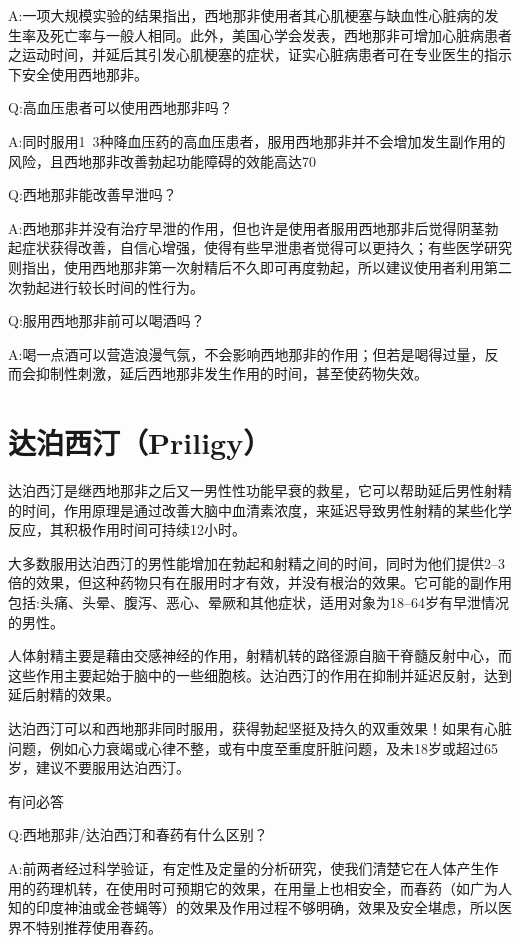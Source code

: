 \documentclass[12pt,UTF8]{ctexbook}
\begin{document}
A:一项大规模实验的结果指出，西地那非使用者其心肌梗塞与缺血性心脏病的发生率及死亡率与一般人相同。此外，美国心学会发表，西地那非可增加心脏病患者之运动时间，并延后其引发心肌梗塞的症状，证实心脏病患者可在专业医生的指示下安全使用西地那非。

Q:高血压患者可以使用西地那非吗？

A:同时服用1~3种降血压药的高血压患者，服用西地那非并不会增加发生副作用的风险，且西地那非改善勃起功能障碍的效能高达70%

Q:西地那非能改善早泄吗？

A:西地那非并没有治疗早泄的作用，但也许是使用者服用西地那非后觉得阴茎勃起症状获得改善，自信心增强，使得有些早泄患者觉得可以更持久；有些医学研究则指出，使用西地那非第一次射精后不久即可再度勃起，所以建议使用者利用第二次勃起进行较长时间的性行为。

Q:服用西地那非前可以喝酒吗？

A:喝一点酒可以营造浪漫气氛，不会影响西地那非的作用；但若是喝得过量，反而会抑制性刺激，延后西地那非发生作用的时间，甚至使药物失效。

\section{达泊西汀（Priligy）}

达泊西汀是继西地那非之后又一男性性功能早衰的救星，它可以帮助延后男性射精的时间，作用原理是通过改善大脑中血清素浓度，来延迟导致男性射精的某些化学反应，其积极作用时间可持续12小时。

大多数服用达泊西汀的男性能增加在勃起和射精之间的时间，同时为他们提供2--3倍的效果，但这种药物只有在服用时才有效，并没有根治的效果。它可能的副作用包括:头痛、头晕、腹泻、恶心、晕厥和其他症状，适用对象为18--64岁有早泄情况的男性。

人体射精主要是藉由交感神经的作用，射精机转的路径源自脑干脊髓反射中心，而这些作用主要起始于脑中的一些细胞核。达泊西汀的作用在抑制并延迟反射，达到延后射精的效果。

达泊西汀可以和西地那非同时服用，获得勃起坚挺及持久的双重效果！如果有心脏问题，例如心力衰竭或心律不整，或有中度至重度肝脏问题，及未18岁或超过65岁，建议不要服用达泊西汀。

有问必答

Q:西地那非/达泊西汀和春药有什么区别？

A:前两者经过科学验证，有定性及定量的分析研究，使我们清楚它在人体产生作用的药理机转，在使用时可预期它的效果，在用量上也相安全，而春药（如广为人知的印度神油或金苍蝇等）的效果及作用过程不够明确，效果及安全堪虑，所以医界不特别推荐使用春药。
\end{document}

